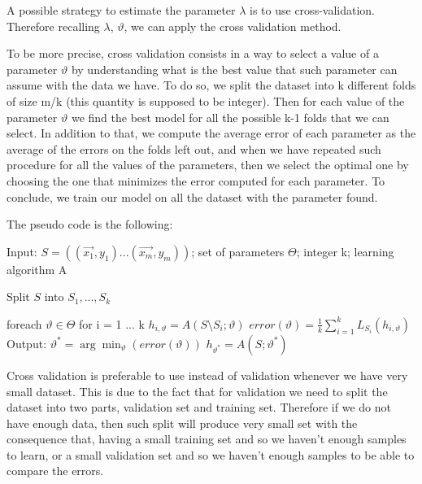 \documentclass[a4paper,11pt,oneside]{book}
\begin{document}
\begin{enumerate}
            \begin{solution}
                A possible strategy to estimate the parameter $\lambda$ is to use cross-validation. Therefore recalling $\lambda$, $\vartheta$, we can apply the cross validation method.
                
                To be more precise, cross validation consists in a way to select a value of a parameter $\vartheta$ by understanding what is the best value that such parameter can assume with the data we have.
                To do so, we split the dataset into k different folds of size m/k (this quantity is supposed to be integer). Then for each value of the parameter $\vartheta$ we find the best model for all the possible k-1 folds that we can select. In addition to that, we compute the average error of each parameter as the average of the errors on the folds left out, and when we have repeated such procedure for all the values of the parameters, then we select the optimal one by choosing the one that minimizes the error computed for each parameter. To conclude, we train our model on all the dataset with the parameter found.
                
                The pseudo code is the following:
                
                Input: $S = ((\vec{x_1},y_1)...(\vec{x_m},y_m))$; set of parameters $\Theta$; integer k; learning algorithm A
                
                Split $S$ into $S_1,...,S_k$
                
                foreach $\vartheta \in \Theta$
                for i = 1 ... k
                    $h_{i,\vartheta} = A(S\setminus S_i; \vartheta)$
                $error(\vartheta) = \frac{1}{k}\sum_{i=1}^k L_{S_i}(h_{i,\vartheta})$
                Output: $\vartheta^* = \arg\min_\vartheta(error(\vartheta))$
                    $h_{\vartheta^*} = A(S;\vartheta^*)$
                
                Cross validation is preferable to use instead of validation whenever we have very small dataset. This is due to the fact that for validation we need to split the dataset into two parts, validation set and training set. Therefore if we do not have enough data, then such split will produce very small set with the consequence that, having a small training set and so we haven't enough samples to learn, or a small validation set and so we haven't enough samples to be able to compare the errors.
            \end{solution}
\end{enumerate}
\end{document}
